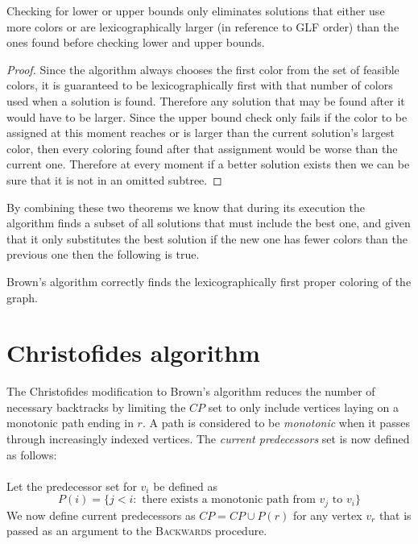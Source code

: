 \begin{theorem}
    Checking for lower or upper bounds only eliminates solutions that either use more colors or are lexicographically larger (in reference to GLF order) than the ones found before checking lower and upper bounds.
\end{theorem}
\begin{proof}
    Since the algorithm always chooses the first color from the set of feasible colors, it is guaranteed to be lexicographically first with that number of colors used when a solution is found. Therefore any solution that may be found after it would have to be larger. Since the upper bound check only fails if the color to be assigned at this moment reaches or is larger than the current solution's largest color, then every coloring found after that assignment would be worse than the current one. Therefore at every moment if a better solution exists then we can be sure that it is not in an omitted subtree.
\end{proof}

By combining these two theorems we know that during its execution the algorithm finds a subset of all solutions that must include the best one, and given that it only substitutes the best solution if the new one has fewer colors than the previous one then the following is true.
\begin{corollary}
    Brown's algorithm correctly finds the lexicographically first proper coloring of the graph.
\end{corollary}


\section{Christofides algorithm}
\label{sec:CA}

The Christofides modification to Brown's algorithm reduces the number of necessary backtracks by limiting the $CP$ set to only include vertices laying on a monotonic path ending in $r$. A path is considered to be \textit{monotonic} when it passes through increasingly indexed vertices. The \textit{current predecessors} set is now defined as follows:
\paragraph{}
Let the predecessor set for $v_i$ be defined as $$P(i) = \{j < i \colon \text{ there exists a monotonic path from } v_j \text{ to } v_i \}$$ 
We now define current predecessors as $CP = CP \cup P(r)$ for any vertex $v_r$ that is passed as an argument to the \textsc{Backwards} procedure. 
